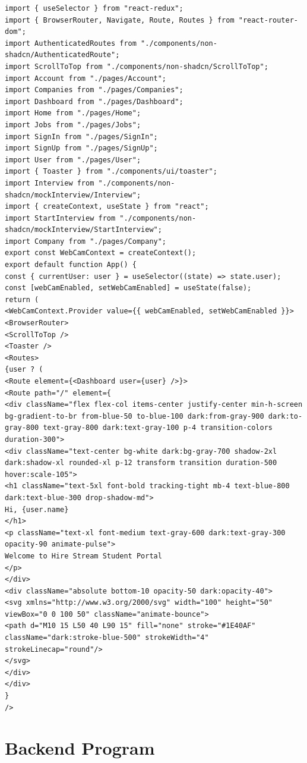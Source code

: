 \documentclass[a4paper, 12pt]{report}
\begin{document}
\noindent \begin{lstlisting}
import { useSelector } from "react-redux";
import { BrowserRouter, Navigate, Route, Routes } from "react-router-dom";
import AuthenticatedRoutes from "./components/non-shadcn/AuthenticatedRoute";
import ScrollToTop from "./components/non-shadcn/ScrollToTop";
import Account from "./pages/Account";
import Companies from "./pages/Companies";
import Dashboard from "./pages/Dashboard";
import Home from "./pages/Home";
import Jobs from "./pages/Jobs";
import SignIn from "./pages/SignIn";
import SignUp from "./pages/SignUp";
import User from "./pages/User";
import { Toaster } from "./components/ui/toaster";
import Interview from "./components/non-shadcn/mockInterview/Interview";
import { createContext, useState } from "react";
import StartInterview from "./components/non-shadcn/mockInterview/StartInterview";
import Company from "./pages/Company";
export const WebCamContext = createContext();
export default function App() {
const { currentUser: user } = useSelector((state) => state.user);
const [webCamEnabled, setWebCamEnabled] = useState(false);
return (
<WebCamContext.Provider value={{ webCamEnabled, setWebCamEnabled }}>
<BrowserRouter>
<ScrollToTop />
<Toaster />
<Routes>
{user ? (
<Route element={<Dashboard user={user} />}>
<Route path="/" element={
<div className="flex flex-col items-center justify-center min-h-screen bg-gradient-to-br from-blue-50 to-blue-100 dark:from-gray-900 dark:to-gray-800 text-gray-800 dark:text-gray-100 p-4 transition-colors duration-300">
<div className="text-center bg-white dark:bg-gray-700 shadow-2xl dark:shadow-xl rounded-xl p-12 transform transition duration-500 hover:scale-105">
<h1 className="text-5xl font-bold tracking-tight mb-4 text-blue-800 dark:text-blue-300 drop-shadow-md">
Hi, {user.name}
</h1>
<p className="text-xl font-medium text-gray-600 dark:text-gray-300 opacity-90 animate-pulse">
Welcome to Hire Stream Student Portal
</p>
</div>
<div className="absolute bottom-10 opacity-50 dark:opacity-40">
<svg xmlns="http://www.w3.org/2000/svg" width="100" height="50" viewBox="0 0 100 50" className="animate-bounce">
<path d="M10 15 L50 40 L90 15" fill="none" stroke="#1E40AF" className="dark:stroke-blue-500" strokeWidth="4" strokeLinecap="round"/>
</svg>
</div>
</div>
}
/>

\end{lstlisting}
\section{\textbf{Backend Program}}
\end{document}
